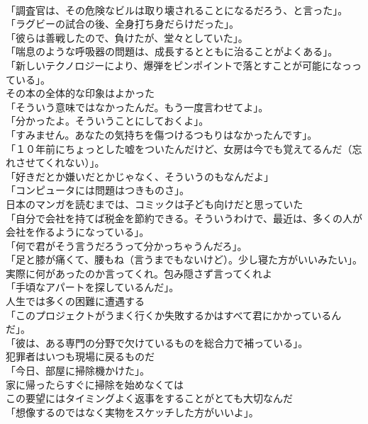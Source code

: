 \documentclass[8pt]{extreport}
\begin{document}
\begin{CJK}{UTF8}{min}
\\	「調査官は、その危険なビルは取り壊されることになるだろう、と言った」。	
\\	「ラグビーの試合の後、全身打ち身だらけだった」。	
\\	「彼らは善戦したので、負けたが、堂々としていた」。	
\\	「喘息のような呼吸器の問題は、成長するとともに治ることがよくある」。	
\\	「新しいテクノロジーにより、爆弾をピンポイントで落とすことが可能になっっている」。	
\\	その本の全体的な印象はよかった	
\\	「そういう意味ではなかったんだ。もう一度言わせてよ」。	
\\	「分かったよ。そういうことにしておくよ」。	
\\	「すみません。あなたの気持ちを傷つけるつもりはなかったんです」。	
\\	「１０年前にちょっとした嘘をついたんだけど、女房は今でも覚えてるんだ（忘れさせてくれない）」。	
\\	「好きだとか嫌いだとかじゃなく、そういうのもなんだよ」	
\\	「コンピュータには問題はつきものさ」。	
\\	日本のマンガを読むまでは、コミックは子ども向けだと思っていた	
\\	「自分で会社を持てば税金を節約できる。そういうわけで、最近は、多くの人が会社を作るようになっている」。	
\\	「何で君がそう言うだろうって分かっちゃうんだろ」。	
\\	「足と膝が痛くて、腰もね（言うまでもないけど）。少し寝た方がいいみたい」。	
\\	実際に何があったのか言ってくれ。包み隠さず言ってくれよ	
\\	「手頃なアパートを探しているんだ」。	
\\	人生では多くの困難に遭遇する	
\\	「このプロジェクトがうまく行くか失敗するかはすべて君にかかっているんだ」。	
\\	「彼は、ある専門の分野で欠けているものを総合力で補っている」。	
\\	犯罪者はいつも現場に戻るものだ	
\\	「今日、部屋に掃除機かけた」。	
\\	家に帰ったらすぐに掃除を始めなくては	
\\	この要望にはタイミングよく返事をすることがとても大切なんだ	
\\	「想像するのではなく実物をスケッチした方がいいよ」。	

\end{CJK}
\end{document}
